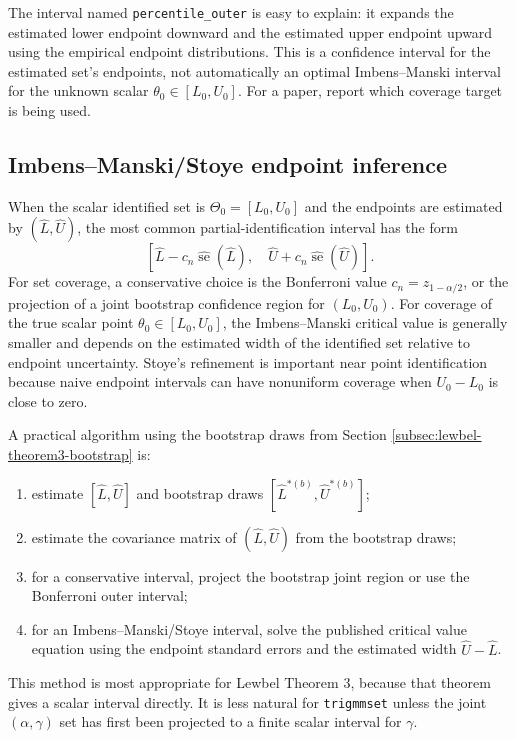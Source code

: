 \documentclass[11pt]{article}
\newcommand{\se}{\operatorname{se}}
\theoremstyle{plain}
\theoremstyle{definition}
\theoremstyle{remark}
\begin{document}
The interval named \texttt{percentile\_outer} is easy to explain: it expands the
estimated lower endpoint downward and the estimated upper endpoint upward using
the empirical endpoint distributions.  This is a confidence interval for the
estimated set's endpoints, not automatically an optimal Imbens--Manski interval
for the unknown scalar $\theta_0\in[L_0,U_0]$.  For a paper, report which
coverage target is being used.

\subsection{Imbens--Manski/Stoye endpoint inference}
\label{subsec:im-stoye}

When the scalar identified set is $\Theta_0=[L_0,U_0]$ and the endpoints are
estimated by $(\hat L,\hat U)$, the most common partial-identification interval
has the form
\begin{equation}
\left[
\hat L-c_n \widehat{\se}(\hat L),\quad
\hat U+c_n \widehat{\se}(\hat U)
\right].
\label{eq:im-form}
\end{equation}
For set coverage, a conservative choice is the Bonferroni value $c_n=z_{1-
\alpha/2}$, or the projection of a joint bootstrap confidence region for
$(L_0,U_0)$.  For coverage of the true scalar point $\theta_0\in[L_0,U_0]$, the
Imbens--Manski critical value is generally smaller and depends on the estimated
width of the identified set relative to endpoint uncertainty.  Stoye's refinement
is important near point identification because naive endpoint intervals can have
nonuniform coverage when $U_0-L_0$ is close to zero.

A practical algorithm using the bootstrap draws from Section
\ref{subsec:lewbel-theorem3-bootstrap} is:
\begin{enumerate}
    \item estimate $[\hat L,\hat U]$ and bootstrap draws
    $[\hat L^{*(b)},\hat U^{*(b)}]$;
    \item estimate the covariance matrix of $(\hat L,\hat U)$ from the bootstrap
    draws;
    \item for a conservative interval, project the bootstrap joint region or use
    the Bonferroni outer interval;
    \item for an Imbens--Manski/Stoye interval, solve the published critical
    value equation using the endpoint standard errors and the estimated width
    $\hat U-\hat L$.
\end{enumerate}

This method is most appropriate for Lewbel Theorem 3, because that theorem gives
a scalar interval directly.  It is less natural for \texttt{trigmmset} unless the
joint $(\alpha,\gamma)$ set has first been projected to a finite scalar interval
for $\gamma$.
\end{document}
